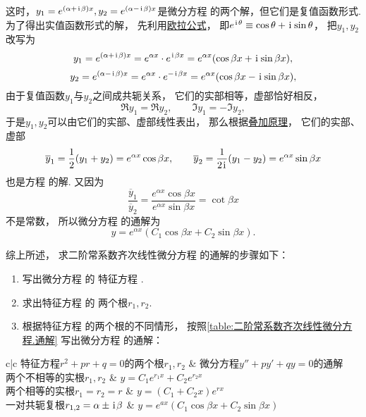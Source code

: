\begin{enumerate}
	这时，\(y_1 = e^{(\alpha+\kern1pt\mathrm{i}\kern1pt\beta)x}, y_2 = e^{(\alpha-\kern1pt\mathrm{i}\kern1pt\beta)x}\)是微分方程  的两个解，但它们是复值函数形式.
	为了得出实值函数形式的解，
	先利用\hyperref[equation:复数.欧拉公式]{欧拉公式}，
	即\(e^{\kern1pt\mathrm{i}\kern1pt\theta} \equiv \cos\theta+\kern1pt\mathrm{i}\kern1pt\sin\theta\)，
	把\(y_1,y_2\)改写为\[
		y_1 = e^{(\alpha+\kern1pt\mathrm{i}\kern1pt\beta)x} = e^{\alpha x} \cdot e^{\kern1pt\mathrm{i}\kern1pt\beta x}
		= e^{\alpha x} (\cos\beta x + \kern1pt\mathrm{i}\kern1pt \sin\beta x),
	\]\[
		y_2 = e^{(\alpha-\kern1pt\mathrm{i}\kern1pt\beta)x} = e^{\alpha x} \cdot e^{-\kern1pt\mathrm{i}\kern1pt\beta x}
		= e^{\alpha x} (\cos\beta x - \kern1pt\mathrm{i}\kern1pt \sin\beta x),
	\]
	由于复值函数\(y_1\)与\(y_2\)之间成共轭关系，
	它们的实部相等，虚部恰好相反，\[
		\Re y_1 = \Re y_2, \qquad
		\Im y_1 = -\Im y_2,
	\]
	于是\(y_1,y_2\)可以由它们的实部、虚部线性表出，
	那么根据\hyperref[theorem:微分方程.二阶非齐次线性微分方程的解的叠加原理]{叠加原理}，
	它们的实部、虚部\[
		\overline{y}_1 = \frac{1}{2} (y_1 + y_2) = e^{\alpha x} \cos\beta x,
		\qquad
		\overline{y}_2 = \frac{1}{2\kern1pt\mathrm{i}\kern1pt} (y_1 - y_2) = e^{\alpha x} \sin\beta x
	\]也是方程  的解.
	又因为\[
		\frac{\overline{y}_1}{\overline{y}_2}
		= \frac{e^{\alpha x} \cos\beta x}{e^{\alpha x} \sin\beta x}
		= \cot\beta x
	\]不是常数，
	所以微分方程  的通解为\[
		y = e^{\alpha x} (C_1 \cos\beta x + C_2 \sin\beta x).
	\]
\end{enumerate}

综上所述，
求二阶常系数齐次线性微分方程  的通解的步骤如下：
\begin{enumerate}
	\item
	写出微分方程  的
	特征方程 .

	\item
	求出特征方程  的
	两个根\(r_1,r_2\).

	\item
	根据特征方程  的两个根的不同情形，
	按照\cref{table:二阶常系数齐次线性微分方程.通解}
	写出微分方程  的通解：
\end{enumerate}

\begin{table}[ht]
	\centering
	\begin{tblr}{c|c}
		\hline
		特征方程\(r^2+pr+q=0\)的两个根\(r_1,r_2\)
			& 微分方程\(y''+py'+qy = 0\)的通解 \\ \hline
		两个不相等的实根\(r_1,r_2\)
			& \(y = C_1 e^{r_1 x} + C_2 e^{r_2 x}\) \\
		两个相等的实根\(r_1=r_2=r\)
			& \(y = (C_1 + C_2 x) e^{r x}\) \\
		一对共轭复根\(r_{1,2}=\alpha\pm\kern1pt\mathrm{i}\kern1pt\beta\)
			& \(y = e^{ax} (C_1 \cos{\beta x} + C_2 \sin{\beta x})\) \\ \hline
	\end{tblr}
	\caption{}
	\label{table:二阶常系数齐次线性微分方程.通解}
\end{table}

